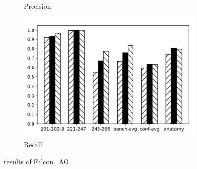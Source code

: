 \documentclass[twoside]{article}
\begin{document}
\begin{figure}[htb!]
\begin{subfigure}{0.3\textwidth}
\caption{Precision}
\label{fig:MultiRegress_Falcon_AO_P}
\end{subfigure}
\begin{subfigure}{0.3\textwidth}
	\centering
\includegraphics[width=\textwidth]{data_figs/MulRegress_Falcon_AO_R.pdf}
\caption{Recall}
\label{fig:MultiRegress_Falcon_AO_R}
\end{subfigure}
\caption{results of Falcon\_AO}
\end{figure}


\end{document}
